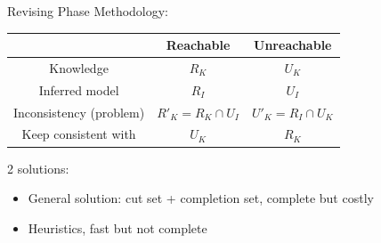 \documentclass[8pt]{beamer}
\begin{document}
\begin{frame}{Revising Phase}
    \centering
    Methodology:
    
    \begin{tabular}{c|c|c}
        &Reachable &Unreachable\\
        \hline
        Knowledge& $R_K$ & $U_K$ \pause\\
        \hline
        Inferred model& $R_I$ & $U_I$\pause\\
        \hline
        Inconsistency (problem)& $R'_K=R_K\cap U_I$ & $U'_K=R_I\cap U_K$\pause\\
        Keep consistent with& $U_K$& $R_K$ \pause
    \end{tabular}

2 solutions:
\begin{itemize}
    \item General solution: cut set + completion set, complete but costly
    \item Heuristics, fast but not complete
\end{itemize}
\end{frame}
\end{document}
